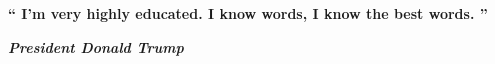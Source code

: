 \documentclass[a4paper,10pt]{memoir}
\begin{document}
\begin{vplace}[0.6]
  \begin{figure}[h]
    \centering
  \end{figure}
    
  \begin{center}
    \Huge{\textbf{`` I'm very highly educated. I know words, I know the best words. ''}}
  \end{center}

  \begin{flushright}
    \Huge{\textbf{\textit{President Donald Trump}}}
  \end{flushright}
\end{vplace}
\end{document}
